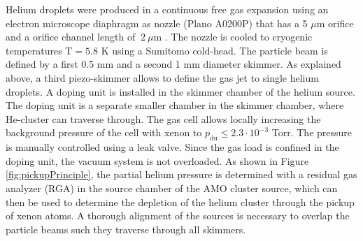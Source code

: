 Helium droplets were produced in a continuous free gas expansion using an electron microscope diaphragm as nozzle (Plano A0200P) that has a 5 $\mu$m orifice and a orifice channel length of $~2\ \mu$m  \citep{Gomez-2011-JCP}. The nozzle is cooled to cryogenic temperatures $\text{T}= 5.8$ K using a Sumitomo cold-head. The particle beam is defined by a first 0.5 mm and a second 1 mm diameter skimmer. As explained above, a third piezo-skimmer allows to define the gas jet to single helium droplets. A doping unit is installed in the skimmer chamber of the helium source. The doping unit is a separate smaller chamber in the skimmer chamber, where He-cluster can traverse through. The gas cell allows locally increasing the background pressure of the cell with xenon to $p_{\text{du}}\leq 2.3\cdot 10^{-3}$ Torr. The pressure is manually controlled using a leak valve. Since the gas load is confined in the doping unit, the vacuum system is not overloaded. As shown in Figure \ref{fig:pickupPrinciple}, the partial helium pressure is determined with a residual gas analyzer (RGA) in the source chamber of the AMO cluster source, which can then be used to determine the depletion of the helium cluster through the pickup of xenon atoms. A thorough alignment of the sources is necessary to overlap the particle beams such they traverse through all skimmers.%
%
%
%
